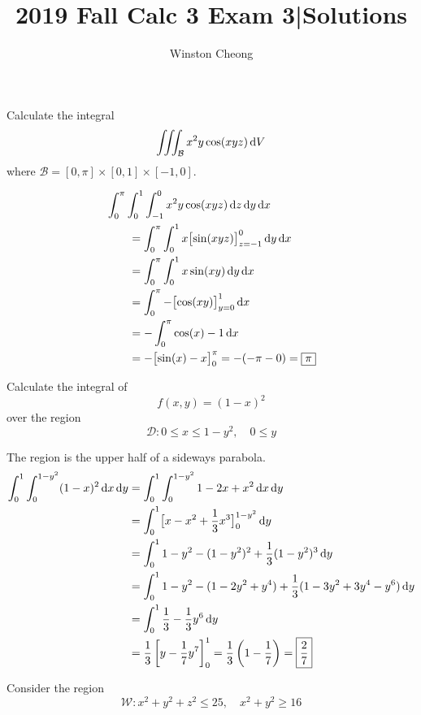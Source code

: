 \documentclass[12pt,answers]{exam}
\title{2019 Fall Calc 3 Exam 3|Solutions}
\author{Winston Cheong}
\date{}
\begin{document}
\begin{questions}
	\question[15]
	Calculate the integral
	\[
		\iiint_{\mathcal B} x^2 y \cos(xyz) \dif V
	\]
	where $\mathcal B = [0,\pi] \times [0,1] \times [-1,0]$.
	\begin{solution}
		\begin{align*}
			\MoveEqLeft \int_0^\pi \int_0^1 \int_{-1}^0 x^2 y \cos(xyz) \dif z \dif y \dif x \\ 
			&= 
			\int_0^\pi \int_0^1 x \bigl[\sin(xyz)\bigr]_{z=-1}^0 \dif y \dif x \\ 
			&= 
			\int_0^\pi \int_0^1 x \sin(xy) \dif y \dif x \\ 
			&= 
			\int_0^\pi - \bigl[\cos(xy)\bigr]_{y=0}^1 \dif x \\ 
			&= - \int_0^\pi \cos(x) - 1 \dif x \\
			&= - \bigl[ \sin(x) - x \bigr]_0^\pi
			= - (-\pi - 0) = \boxed{\pi}
		\end{align*}
	\end{solution}

	\newpage
	\question[15]
	Calculate the integral of
	\[
		f(x,y) = (1-x)^2
	\]
	over the region
	\[
		\mathcal D : 0 \le x \le 1-y^2, \quad 0 \le y
	\]
	\begin{solution}
		The region is the upper half of a sideways parabola.
		\begin{align*}
			\int_0^1 \int_0^{1-y^2} (1-x)^2 \dif x \dif y
			&= \int_0^1 \int_0^{1-y^2} 1 - 2x + x^2 \dif x \dif y\\
			&= \int_0^1 \bigl[x - x^2 + \frac13 x^3\bigr]_0^{1-y^2} \dif y\\
			&= \int_0^1 1-y^2 - (1-y^2)^2 + \frac13 (1-y^2)^3 \dif y \\ 
			&= \int_0^1 1-y^2 - (1-2y^2 + y^4) + \frac13 (1- 3y^2 + 3y^4 - y^6) \dif y \\ 
			&= \int_0^1 \frac13 - \frac13 y^6 \dif y\\
			&= \frac13 \left[ y - \frac17 y^7 \right]_0^1 
			= \frac13 \left(1-\frac17\right) = \boxed{\frac27}
		\end{align*}
	\end{solution}

	\newpage
	\question Consider the region
	\[
		\mathcal W : x^2 + y^2 + z^2 \le 25, \quad x^2 + y^2 \ge 16
	\]
\end{questions}
\end{document}
